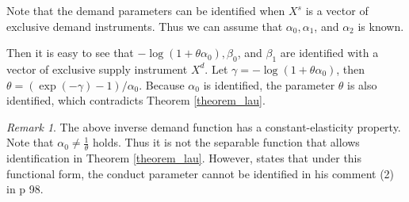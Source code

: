 \documentclass[11pt, a4paper]{article}
\theoremstyle{remark}
\newtheorem{remark}{Remark}
\begin{document}
Note that the demand parameters can be identified when $X^s$ is a vector of exclusive demand instruments.
Thus we can assume that $\alpha_0, \alpha_1$, and $\alpha_2$ is known.  

Then it is easy to see that $- \log(1 + \theta\alpha_0), \beta_0$, and $\beta_1$ are identified with a vector of exclusive supply instrument $X^d$.
Let $\gamma = - \log(1 + \theta\alpha_0)$, then $\theta = (\exp(-\gamma) - 1)/\alpha_0$.
Because $\alpha_0$ is identified, the parameter $\theta$ is also identified, which contradicts Theorem \ref{theorem_lau}.

\begin{remark}
    The above inverse demand function has a constant-elasticity property. 
    Note that $\alpha_0 \ne \frac{1}{\theta}$ holds.
    Thus it is not the separable function that allows identification in Theorem \ref{theorem_lau}.
    However, \citet{lau1982identifying} states that under this functional form, the conduct parameter cannot be identified in his comment (2) in p 98.
\end{remark}




\newpage


\end{document}
